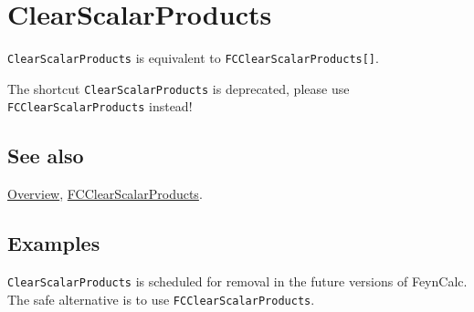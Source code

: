 \documentclass[../FeynCalcManual.tex]{subfiles}
\begin{document}
\hypertarget{clearscalarproducts}{
\section{ClearScalarProducts}\label{clearscalarproducts}}

\texttt{ClearScalarProducts} is equivalent to
\texttt{FCClearScalarProducts[\allowbreak{}]}.

The shortcut \texttt{ClearScalarProducts} is deprecated, please use
\texttt{FCClearScalarProducts} instead!

\subsection{See also}

\hyperlink{toc}{Overview},
\hyperlink{fcclearscalarproducts}{FCClearScalarProducts}.

\subsection{Examples}

\texttt{ClearScalarProducts} is scheduled for removal in the future
versions of FeynCalc. The safe alternative is to use
\texttt{FCClearScalarProducts}.
\end{document}
